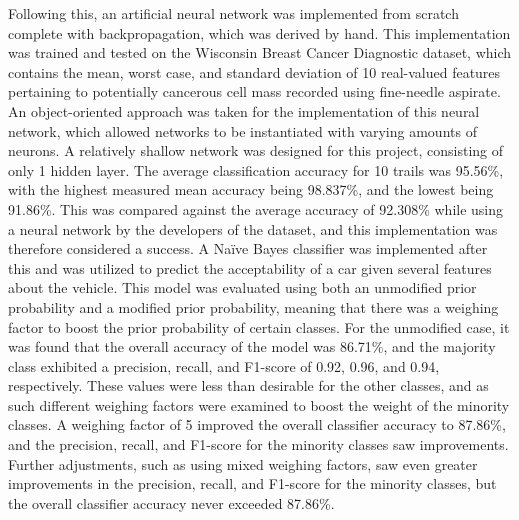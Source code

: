 \documentclass[a4paper]{article}
\begin{document}
Following this, an artificial neural network was implemented from scratch complete with backpropagation, which was derived by hand. This implementation was trained and tested on the Wisconsin Breast Cancer Diagnostic dataset, which contains the mean, worst case, and standard deviation of 10 real-valued features pertaining to potentially cancerous cell mass recorded using fine-needle aspirate. An object-oriented approach was taken for the implementation of this neural network, which allowed networks to be instantiated with varying amounts of neurons. A relatively shallow network was designed for this project, consisting of only 1 hidden layer. The average classification accuracy for 10 trails was 95.56\%, with the highest measured mean accuracy being 98.837\%, and the lowest being 91.86\%. This was compared against the average accuracy of 92.308\% while using a neural network by the developers of the dataset, and this implementation was therefore considered a success. A Naïve Bayes classifier was implemented after this and was utilized to predict the acceptability of a car given several features about the vehicle. This model was evaluated using both an unmodified prior probability and a modified prior probability, meaning that there was a weighing factor to boost the prior probability of certain classes. For the unmodified case, it was found that the overall accuracy of the model was 86.71\%, and the majority class exhibited a precision, recall, and F1-score of 0.92, 0.96, and 0.94, respectively. These values were less than desirable for the other classes, and as such different weighing factors were examined to boost the weight of the minority classes. A weighing factor of 5 improved the overall classifier accuracy to 87.86\%, and the precision, recall, and F1-score for the minority classes saw improvements. Further adjustments, such as using mixed weighing factors, saw even greater improvements in the precision, recall, and F1-score for the minority classes, but the overall classifier accuracy never exceeded 87.86\%.
\end{document}
